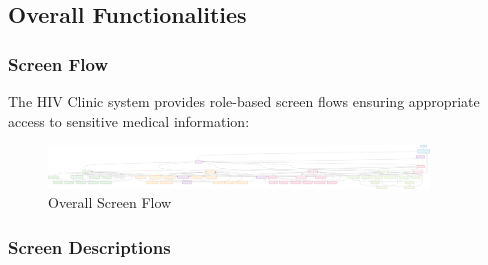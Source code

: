 \documentclass[12pt,a4paper]{article}
\begin{document}
\subsection{Overall Functionalities}

\subsubsection{Screen Flow}

The HIV Clinic system provides role-based screen flows ensuring appropriate access to sensitive medical information:

\begin{figure}[H]
    \centering
    \includegraphics[width=0.9\textwidth]{diagrams/user_interface_flow.svg}
    \caption{Overall Screen Flow}
    \label{fig:screen-flow}
\end{figure}

\subsubsection{Screen Descriptions}
\end{document}
